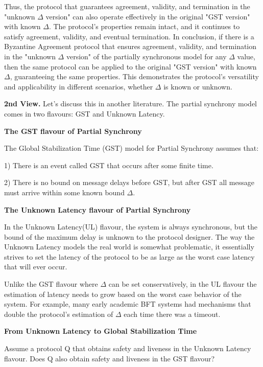 \documentclass{article}
\begin{document}
\begin{enumerate}
Thus, the protocol that guarantees agreement, validity, and termination in the "unknown $\Delta$ version" can also operate effectively in the original "GST version" with known $\Delta$.
The protocol's properties remain intact, and it continues to satisfy agreement, validity, and eventual termination.
In conclusion, if there is a Byzantine Agreement protocol that ensures agreement, validity, and termination in the "unknown $\Delta$ version" of the partially synchronous model for any $\Delta$ value, then the same protocol can be applied to the original "GST version" with known $\Delta$, guaranteeing the same properties. This demonstrates the protocol's versatility and applicability in different scenarios, whether $\Delta$ is known or unknown.

\end{enumerate}

\textbf{2nd View.} Let's discuss this in another literature. The partial synchrony model comes in two flavours: GST and Unknown Latency.


\par

\textbf{The GST flavour of Partial Synchrony}
\par
The Global Stabilization Time (GST) model for Partial Synchrony assumes that:

1) There is an event called GST that occurs after some finite time.

2) There is no bound on message delays before GST, but after GST all message must arrive within some known bound $\Delta$.


\textbf{The Unknown Latency flavour of Partial Synchrony}

In the Unknown Latency(UL) flavour, the system is always synchronous, but the bound of the maximum delay is unknown to the protocol designer. The way the Unknown Latency models the real world is somewhat problematic, it essentially strives to set the latency of the protocol to be as large as the worst case latency that will ever occur.

Unlike the GST flavour where $\Delta$ can be set conservatively, in the UL flavour the estimation of latency needs to grow based on the worst case behavior of the system. For example, many early academic BFT systems had mechanisms that double the protocol’s estimation of $\Delta$ each time there was a timeout.

\textbf{From Unknown Latency to Global Stabilization Time}

Assume a protocol Q
 that obtains safety and liveness in the Unknown Latency flavour. Does Q
 also obtain safety and liveness in the GST flavour?
\end{document}
